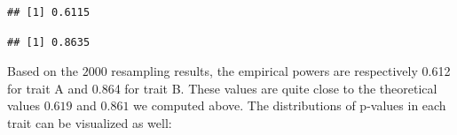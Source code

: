 \documentclass[
]{article}
\newenvironment{Shaded}{\begin{snugshade}}{\end{snugshade}}
\newcommand{\AttributeTok}[1]{\textcolor[rgb]{0.77,0.63,0.00}{#1}}
\newcommand{\ControlFlowTok}[1]{\textcolor[rgb]{0.13,0.29,0.53}{\textbf{#1}}}
\newcommand{\DecValTok}[1]{\textcolor[rgb]{0.00,0.00,0.81}{#1}}
\newcommand{\DocumentationTok}[1]{\textcolor[rgb]{0.56,0.35,0.01}{\textbf{\textit{#1}}}}
\newcommand{\FloatTok}[1]{\textcolor[rgb]{0.00,0.00,0.81}{#1}}
\newcommand{\FunctionTok}[1]{\textcolor[rgb]{0.00,0.00,0.00}{#1}}
\newcommand{\NormalTok}[1]{#1}
\newcommand{\OtherTok}[1]{\textcolor[rgb]{0.56,0.35,0.01}{#1}}
\newcommand{\SpecialCharTok}[1]{\textcolor[rgb]{0.00,0.00,0.00}{#1}}
\newcommand{\StringTok}[1]{\textcolor[rgb]{0.31,0.60,0.02}{#1}}
\begin{document}
\begin{verbatim}
## [1] 0.6115
\end{verbatim}

\begin{Shaded}
\end{Shaded}

\begin{verbatim}
## [1] 0.8635
\end{verbatim}

Based on the \(2000\) resampling results, the empirical powers are
respectively 0.612 for trait A and 0.864 for trait B. These values are
quite close to the theoretical values \(0.619\) and \(0.861\) we
computed above. The distributions of p-values in each trait can be
visualized as well:
\end{document}
